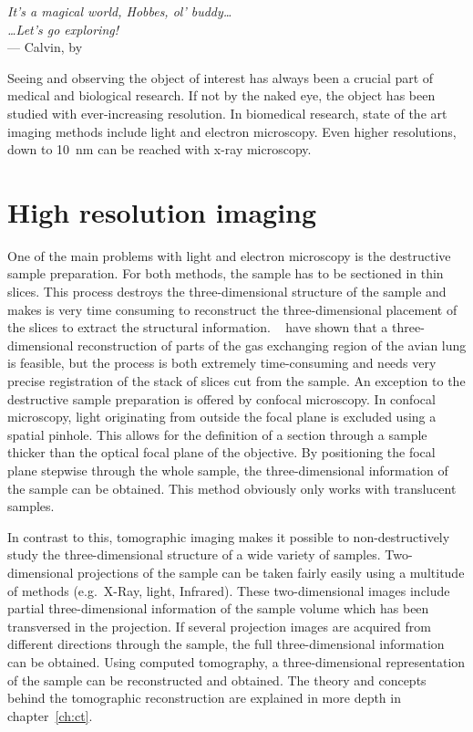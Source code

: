 \label{ch:Introduction}
\begin{flushright}{\slshape    
		It's a magical world, Hobbes, ol' buddy\dots\\
		\dots Let's go exploring!}\\ \medskip
		--- Calvin, by \citep{Watterson1996}
\end{flushright}
\bigskip
{}
Seeing and observing the object of interest has always been a crucial part of medical and biological research. If not by the naked eye, the object has been studied with ever-increasing resolution. In biomedical research, state of the art imaging methods include light and electron microscopy. Even higher resolutions, down to \SI{10}{\nano\meter}  can be reached with x-ray microscopy.

\section{High resolution imaging}
One of the main problems with light and electron microscopy is the destructive sample preparation. For both methods, the sample has to be sectioned in thin slices. This process destroys the three-dimensional structure of the sample and makes is very time consuming to reconstruct the three-dimensional placement of the slices to extract the structural information. \citet{Woodward2005}~ have shown that a three-dimensional reconstruction of parts of the gas exchanging region of the avian lung is feasible, but the process is both extremely time-consuming and needs very precise registration of the stack of slices cut from the sample. An exception to the destructive sample preparation is offered by confocal microscopy. In confocal microscopy, light originating from outside the focal plane is excluded using a spatial pinhole. This allows for the definition of a section through a sample thicker than the optical focal plane of the objective. By positioning the focal plane stepwise through the whole sample, the three-dimensional information of the sample can be obtained. This method obviously only works with translucent samples.

In contrast to this, tomographic imaging makes it possible to non-destructively study the three-dimensional structure of a wide variety of samples. Two-dimensional projections of the sample can be taken fairly easily using a multitude of methods (e.g.\ X-Ray, light, Infrared). These two-dimensional images include partial three-dimensional information of the sample volume which has been transversed in the projection. If several projection images are acquired from different directions through the sample, the full three-dimensional information can be obtained. Using computed tomography, a three-dimensional representation of the sample can be reconstructed and obtained. The theory and concepts behind the tomographic reconstruction are explained in more depth in chapter~\ref{ch:ct}.

